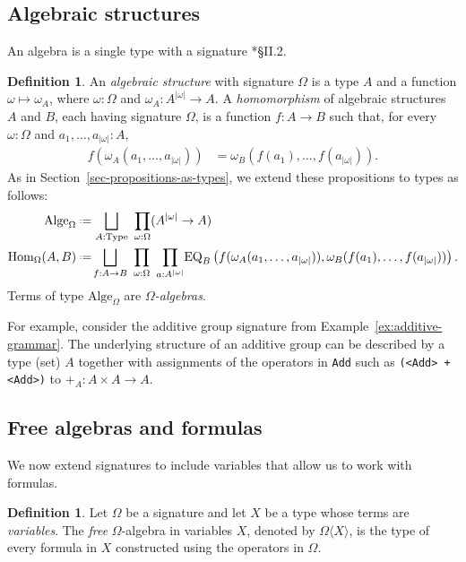 \documentclass{amsart}
\numberwithin{lstfloat}{section}
\newcommand{\Free}[2]{#1\langle #2\rangle}
\newcommand{\defeq}{\mathrel{\hstretch{.13}{=}\hspace{.2ex}{=}}}
\theoremstyle{definition}
\newtheorem{defn}[thm]{Definition}
\theoremstyle{remark}
\numberwithin{equation}{section}
\begin{document}
\subsection{Algebraic structures}
An algebra is a single type with a signature \cite{Cohn}*{\S II.2}.

\begin{defn}\label{def:alg-structure}
  An \emph{algebraic structure} with signature $\Omega$ 
is a type $A$ and a function $\omega\mapsto \omega_A$, 
where $\omega:\Omega$ and $\omega_A:A^{|\omega|}\to A$.
  A \emph{homomorphism} of algebraic structures $A$ and $B$, 
each having signature $\Omega$, 
  is a function $f:A\to B$ such that, for every $\omega:\Omega$ and 
  $a_1,\ldots,a_{|\omega|}:A$,
  \begin{align*} 
    f(\omega_A(a_1,\ldots, a_{|\omega|})) & = \omega_B(f(a_1),\ldots, f(a_{|\omega|})).
  \end{align*}
As in Section~\ref{sec-propositions-as-types}, we extend these propositions to 
  types as follows:
  \begin{align*}
    \mathrm{Alge}_{\Omega} & \defeq \bigsqcup_{A:\mathrm{Type}}~\prod_{\omega:\Omega} (A^{|\omega|}\to A)
    \\
    \mathrm{Hom}_{\Omega}(A,B) & \defeq \!\bigsqcup_{f:A\to B}~\prod_{\omega:\Omega}~\prod_{a:A^{|\omega|}}\!
      \mathrm{EQ}_B\left(f(\omega_A(a_1,\ldots,a_{|\omega|})), \omega_B(f(a_1),\ldots,f(a_{|\omega|}))\right).
  \end{align*}
  Terms of type $\mathrm{Alge}_{\Omega}$ are \emph{$\Omega$-algebras}.
\end{defn}

For example, consider the additive group signature from
Example~\ref{ex:additive-grammar}. 
The underlying structure of an additive group can be described by 
a type (set) 
$A$ together with
assignments of the operators in \texttt{Add} such as \texttt{(<Add> + <Add>)} to $+_A : A\times A\to A$.

\subsection{Free algebras and formulas}\label{sec:free}

We now extend signatures to include variables that allow us to work with formulas.

\begin{defn}
  Let $\Omega$ be a signature and 
let $X$ be a type whose terms are \emph{variables}. The
  \emph{free} $\Omega$-algebra in variables $X$, denoted by $\Free{\Omega}{X}$,
  is the type of every formula in $X$ constructed using the operators in
  $\Omega$. 
\end{defn}
\end{document}
